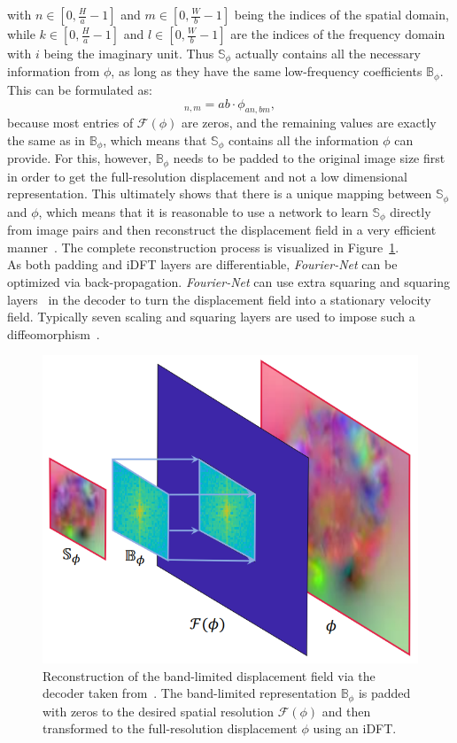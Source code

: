 with $n \in [0, \frac{H}{a}-1]$ and $m \in [0, \frac{W}{b}-1]$ being the indices of the spatial domain, while $k \in [0, \frac{H}{a}-1]$ and $l \in [0, \frac{W}{b}-1]$ are the indices of the frequency domain with $i$ being the imaginary unit. Thus $\mathbb{S}_\phi$ actually contains all the necessary information from $\phi$, as long as they have the same low-frequency coefficients $\mathbb{B}_\phi$. This can be formulated as:
\begin{equation}
	[\mathbb{S}_\phi]_{n,m} = ab \cdot \phi_{an,bm},
\end{equation}
because most entries of $\mathcal{F}(\phi)$ are zeros, and the remaining values are exactly the same as in $\mathbb{B}_\phi$, which means that $\mathbb{S}_\phi$ contains all the information $\phi$ can provide. For this, however, $\mathbb{B}_\phi$ needs to be padded to the original image size first in order to get the full-resolution displacement and not a low dimensional representation. This ultimately shows that there is a unique mapping between $\mathbb{S}_\phi$ and $\phi$, which means that it is reasonable to use a network to learn $\mathbb{S}_\phi$ directly from image pairs and then reconstruct the displacement field in a very efficient manner~\cite{Fourier-Net}. The complete reconstruction process is visualized in Figure~\ref{fig:DecoderDisplacementField}.\\
As both padding and iDFT layers are differentiable, \emph{Fourier-Net} can be optimized via back-propagation. \emph{Fourier-Net} can use extra squaring and squaring layers~\cite{ScaleAndSquare,Dalca2018} in the decoder to turn the displacement field into a stationary velocity field. Typically seven scaling and squaring layers are used to impose such a diffeomorphism~\cite{Fourier-Net,Dalca2018}.

\begin{figure}[h] %
	\centering
	\graphicspath{{images/}{\main/images/}}
	\includegraphics[width=.65\linewidth]{DecoderDisplacementField.png} 
	\caption{Reconstruction of the band-limited displacement field via the decoder taken from~\cite{Fourier-Net+}. The band-limited representation $\mathbb{B}_\phi$ is padded with zeros to the desired spatial resolution $\mathcal{F}(\phi)$ and then transformed to the full-resolution displacement $\phi$ using an iDFT.}
	\label{fig:DecoderDisplacementField}
\end{figure} 

